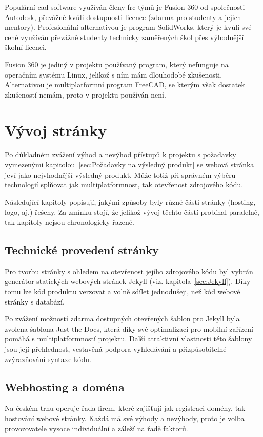 \documentclass[a4paper, 12pt]{article}
\begin{document}
  Populární \gls{cad} software využíván členy \gls{frc} týmů je Fusion 360 od společnosti Autodesk, převážně kvůli dostupnosti licence (zdarma pro studenty a jejich mentory). Profesionální alternativou je program SolidWorks, který je kvůli své ceně využíván převážně studenty technicky zaměřených škol přes výhodnější školní licenci.

  Fusion 360 je jediný v projektu používaný program, který nefunguje na operačním systému Linux, jelikož s ním mám dlouhodobé zkušenosti. Alternativou je multiplatformní program FreeCAD, se kterým však dostatek zkušeností nemám, proto v projektu používán není.


  \section{Vývoj stránky}
  Po důkladném zvážení výhod a nevýhod přístupů k projektu s požadavky vymezenými kapitolou~\ref{sec:Požadavky na výsledný produkt} se webová stránka jeví jako nejvhodnější výsledný produkt. Může totiž při správném výběru technologií splňovat jak multiplatformnost, tak otevřenost zdrojového kódu.

  Následující kapitoly popisují, jakými způsoby byly různé části stránky (hosting, logo, aj.) řešeny. Za zmínku stojí, že jelikož vývoj těchto částí probíhal paralelně, tak kapitoly nejsou chronologicky řazené.


  \subsection{Technické provedení stránky}
  Pro tvorbu stránky s ohledem na otevřenost jejího zdrojového kódu byl vybrán generátor statických webových stránek Jekyll (viz. kapitola~\ref{sec:Jekyll}). Díky tomu lze kód produktu verzovat a volně sdílet jednodušeji, než kód webové stránky s databází.

  Po zvážení možností zdarma dostupných otevřených šablon pro Jekyll byla zvolena šablona Just the Docs, která díky své optimalizaci pro mobilní zařízení pomáhá s multiplatformností projektu. Další atraktivní vlastnosti této šablony jsou její přehlednost, vestavěná podpora vyhledávání a přizpůsobitelné zvýrazňování syntaxe kódu.


  \subsection{Webhosting a doména} \label{sec:Webhosting a doména}
  Na českém trhu operuje řada firem, které zajišťují jak registraci domény, tak hostování webové stránky. Každá má své výhody a nevýhody, proto je volba provozovatele vysoce individuální a záleží na řadě faktorů.
\end{document}
